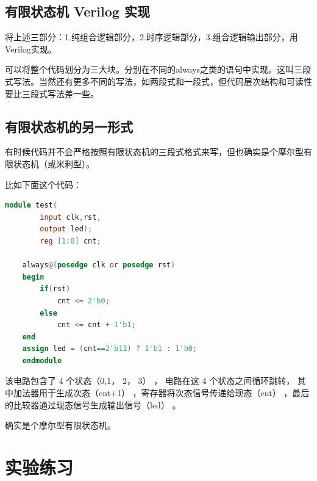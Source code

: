 \documentclass[UTF8]{article}
\begin{document}
	\subsection{有限状态机 Verilog 实现}
	将上述三部分：1.纯组合逻辑部分，2.时序逻辑部分，3.组合逻辑输出部分，用Verilog实现。\par
	可以将整个代码划分为三大块。分别在不同的always之类的语句中实现。这叫三段式写法。当然还有更多不同的写法，如两段式和一段式，但代码层次结构和可读性要比三段式写法差一些。
	
	\subsection{有限状态机的另一形式}
	有时候代码并不会严格按照有限状态机的三段式格式来写，但也确实是个摩尔型有限状态机（或米利型）。\par
	比如下面这个代码：\par
	\begin{lstlisting}[language=Verilog]
	module test(
		input clk,rst,
		output led);
		reg [1:0] cnt;
		
	always@(posedge clk or posedge rst)
	begin
		if(rst)
			cnt <= 2'b0;
		else
			cnt <= cnt + 1'b1;
	end
	assign led = (cnt==2'b11) ? 1'b1 : 1'b0;
	endmodule
	\end{lstlisting}
	该电路包含了 4 个状态（0,1， 2， 3） ， 电路在这 4 个状态之间循环跳转， 其中加法器用于生成次态（cnt+1） ，寄存器将次态信号传递给现态（cnt） ，最后的比较器通过现态信号生成输出信号（led） 。 \par
	确实是个摩尔型有限状态机。\par
	

	\section{实验练习}
\end{document}
